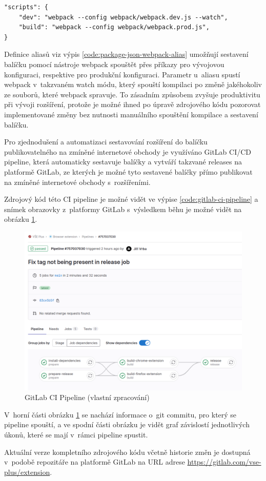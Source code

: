 \begin{lstlisting}[label={code:package-json-webpack-alias}, caption={Definice aliasů pro práci s~nástrojem webpack (vlastní zpracování)}]
"scripts": {
    "dev": "webpack --config webpack/webpack.dev.js --watch",
    "build": "webpack --config webpack/webpack.prod.js",
}
\end{lstlisting}

Definice aliasů viz výpis \ref{code:package-json-webpack-alias} umožňují sestavení balíčku pomocí nástroje webpack spouštět přes příkazy  pro vývojovou konfiguraci, respektive  pro produkční konfiguraci. Parametr  u~aliasu  spustí webpack v~takzvaném watch módu, který spouští kompilaci po změně jakéhokoliv ze souborů, které webpack spravuje. To zásadním způsobem zvyšuje produktivitu při vývoji rozšíření, protože je možné ihned po úpravě zdrojového kódu pozorovat implementované změny bez nutnosti manuálního spouštění kompilace a sestavení balíčku.

Pro zjednodušení a automatizaci sestavování rozšíření do balíčku publikovatelného na zmíněné internetové obchody je využíváno GitLab CI/CD pipeline, která automaticky sestavuje balíčky a vytváří takzvané releases na platformě GitLab, ze kterých je možné tyto sestavené balíčky přímo publikovat na zmíněné internetové obchody s~rozšířeními. 

Zdrojový kód této CI pipeline je možné vidět ve výpise \ref{code:gitlab-ci-pipeline} a snímek obrazovky z~platformy GitLab s~výsledkem běhu je možné vidět na obrázku \ref{fig:extension-gitlab-ci}. 

\begin{figure}[htbp!]\centering
    \includegraphics[width=\textwidth]{img/extension-gitlab-ci-pipeline-overview.png}
    \caption{GitLab CI Pipeline (vlastní zpracování)}
    \label{fig:extension-gitlab-ci}
\end{figure}

V~horní části obrázku \ref{fig:extension-gitlab-ci} se nachází informace o~git commitu, pro který se pipeline spouští, a ve spodní části obrázku je vidět graf závislostí jednotlivých úkonů, které se mají v~rámci pipeline spustit.

Aktuální verze kompletního zdrojového kódu včetně historie změn je dostupná v~podobě repozitáře na platformě GitLab na URL adrese \url{https://gitlab.com/vse-plus/extension}.
